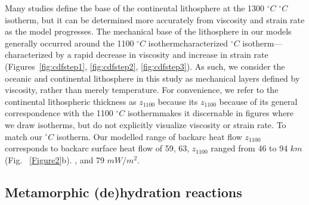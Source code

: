 \documentclass[draft,linenumbers]{agujournal2018} %
\providecommand{\DIFaddtex}[1]{{\protect\color{blue} \sf #1}} %
\providecommand{\DIFdeltex}[1]{{\protect\color{red} \scriptsize #1}} %
\providecommand{\DIFaddbegin}{} %
\providecommand{\DIFaddend}{} %
\providecommand{\DIFdelbegin}{} %
\providecommand{\DIFdelend}{} %
\providecommand{\DIFadd}[1]{\texorpdfstring{\DIFaddtex{#1}}{#1}} %
\providecommand{\DIFdel}[1]{\texorpdfstring{\DIFdeltex{#1}}{}} %
\newcommand{\DIFscaledelfig}{0.3}
\newlength{\DIFdelgraphicswidth} %
\newlength{\DIFdelgraphicsheight} %
\newcommand{\DIFaddincludegraphics}[2][]{{\color{blue}\fbox{\DIFOincludegraphics[#1]{#2}}}} %
\newcommand{\DIFdelincludegraphics}[2][]{%
\sbox{\DIFdelgraphicsbox}{\DIFOincludegraphics[#1]{#2}}%
\settoboxwidth{\DIFdelgraphicswidth}{\DIFdelgraphicsbox} %
\settoboxtotalheight{\DIFdelgraphicsheight}{\DIFdelgraphicsbox} %
\scalebox{\DIFscaledelfig}{%
\parbox[b]{\DIFdelgraphicswidth}{\usebox{\DIFdelgraphicsbox}\\[-\baselineskip] \rule{\DIFdelgraphicswidth}{0em}}\llap{\resizebox{\DIFdelgraphicswidth}{\DIFdelgraphicsheight}{%
\setlength{\unitlength}{\DIFdelgraphicswidth}%
\begin{picture}(1,1)%
\thicklines\linethickness{2pt} %
{\color[rgb]{1,0,0}\put(0,0){\framebox(1,1){}}}%
{\color[rgb]{1,0,0}\put(0,0){\line( 1,1){1}}}%
{\color[rgb]{1,0,0}\put(0,1){\line(1,-1){1}}}%
\end{picture}%
}\hspace*{3pt}}} %
} %
\DeclareRobustCommand{\DIFaddbegin}{\DIFOaddbegin \let\includegraphics\DIFaddincludegraphics} %
\DeclareRobustCommand{\DIFaddend}{\DIFOaddend \let\includegraphics\DIFOincludegraphics} %
\DeclareRobustCommand{\DIFdelbegin}{\DIFOdelbegin \let\includegraphics\DIFdelincludegraphics} %
\DeclareRobustCommand{\DIFdelend}{\DIFOaddend \let\includegraphics\DIFOincludegraphics} %
\begin{document}
Many studies define the base of the continental lithosphere at the 1300
\DIFdelbegin \DIFdel{$^{\circ}C$ }\DIFdelend \DIFaddbegin \DIFadd{\(^{\circ}C\) }\DIFaddend isotherm, but it can be determined more accurately from
viscosity and strain rate as the model progresses. The mechanical base
of the lithosphere in our models generally occurred around the 1100
\DIFdelbegin \DIFdel{$^{\circ}C$ isotherm\textemdash characterized }\DIFdelend \DIFaddbegin \DIFadd{\(^{\circ}C\) isotherm---characterized }\DIFaddend by a rapid decrease in viscosity
and increase in strain rate
\DIFaddbegin \DIFadd{(Figures~\ref{fig:cdfstep1}, \ref{fig:cdfstep2}, \ref{fig:cdfstep3})}\DIFaddend . As
such, we consider the oceanic and continental lithosphere in this study
as mechanical layers \DIFaddbegin \DIFadd{defined by viscosity, rather than merely
temperature}\DIFaddend . For convenience, we refer to the continental lithospheric
thickness as \DIFdelbegin \DIFdel{$z_{1100}$ because its }\DIFdelend \DIFaddbegin \DIFadd{\(z_{1100}\) because of its general }\DIFaddend correspondence with the
1100 \DIFdelbegin \DIFdel{$^{\circ}C$ isothermmakes it discernable in figures where we draw isotherms, but do not explicitly visualize viscosity or strain rate. To match our }\DIFdelend \DIFaddbegin \DIFadd{\(^{\circ}C\) isotherm. Our }\DIFaddend modelled range of \DIFdelbegin \DIFdel{backarc heat flow}\DIFdelend \DIFaddbegin \DIFadd{\(z_{1100}\)
corresponds to backarc surface heat flow of 59, 63}\DIFaddend , \DIFdelbegin \DIFdel{$z_{1100}$ ranged from 46 to 94 $km$ (Fig.
~\ref{Figure2}b).
}\DIFdelend \DIFaddbegin \DIFadd{69, and 79
\(mW/m^{2}\).
}\DIFaddend

\subsection{Metamorphic (de)hydration reactions}
\DIFaddbegin
\end{document}
